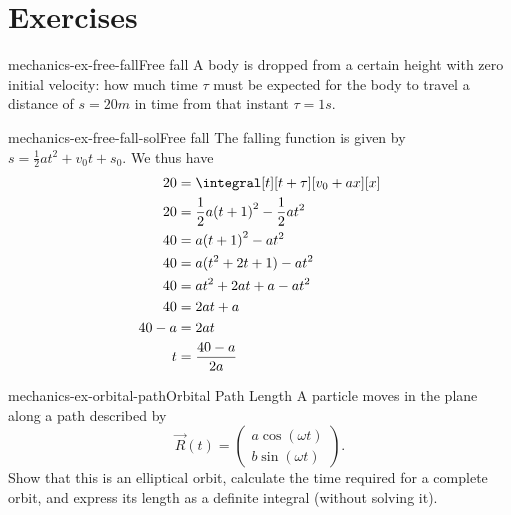 \documentclass[preview]{standalone}
\begin{document}
\genpage

\section{Exercises}

\begin{snippetexercise}{mechanics-ex-free-fall}{Free fall}
    A body is dropped from a certain height with zero initial velocity: how much time
    \(\tau\) must be expected for the body to travel a distance of \(s = 20m\) in time from that instant
    \(\tau = 1s\).
\end{snippetexercise}

\begin{snippetsolution}{mechanics-ex-free-fall-sol}{Free fall}
    The falling function is given by \(s = \frac{1}{2}at^2 + v_0t + s_0\).
    We thus have
    \begin{align*}
        20 &= \integral[t][t+\tau][v_0 + ax][x] \\
        20 &= \frac{1}{2}a{(t+1)}^2 - \frac{1}{2}at^2 \\
        40 &= a{(t+1)}^2 - at^2 \\
        40 &= a(t^2 + 2t + 1) - at^2 \\
        40 &= at^2 + 2at + a - at^2 \\
        40 &= 2at + a \\
        40 - a &= 2at \\
        t &= \frac{40 - a}{2a}
    \end{align*}
\end{snippetsolution}

\begin{snippetexercise}{mechanics-ex-orbital-path}{Orbital Path Length}
    A particle moves in the plane along a path described by 
    \[
    \vec{R}(t) = 
    \begin{pmatrix}
        a \cos(\omega t) \\
        b \sin(\omega t)
    \end{pmatrix}.
    \]
    Show that this is an elliptical orbit, calculate the time required for a complete orbit, and express its length as a definite integral (without solving it).
\end{snippetexercise}
\end{document}
